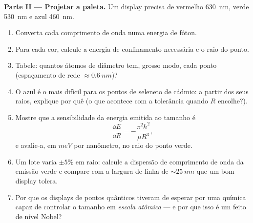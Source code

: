 \begin{problem}
\medskip\noindent\textbf{Parte II --- Projetar a paleta.}
Um display precisa de vermelho \qty{630}{nm}, verde \qty{530}{nm} e
azul \qty{460}{nm}.
\begin{enumerate}[resume]
  \item Converta cada comprimento de onda numa energia de fóton.
  \item Para cada cor, calcule a energia de confinamento necessária e
        o raio do ponto.
  \item Tabele: quantos átomos de diâmetro tem, grosso modo, cada
        ponto (espaçamento de rede $\approx \qty{0.6}{nm}$)?
  \item O azul é o mais difícil para os pontos de seleneto de cádmio:
        a partir dos seus raios, explique por quê (o que acontece com
        a tolerância quando $R$ encolhe?).
  \item Mostre que a sensibilidade da energia emitida ao tamanho é
        \[
        \frac{\dd E}{\dd R} = -\frac{\pi^2\hbar^2}{\mu R^3} ,
        \]
        e avalie-a, em $\unit{meV}$ por nanômetro, no raio do ponto
        verde.
  \item Um lote varia $\pm5\%$ em raio: calcule a dispersão de
        comprimento de onda da emissão verde e compare com a largura
        de linha de $\sim\qty{25}{nm}$ que um bom display tolera.
  \item Por que os displays de pontos quânticos tiveram de esperar por
        uma química capaz de controlar o tamanho em \emph{escala
        atômica} --- e por que isso é um feito de nível Nobel?
\end{enumerate}


\end{problem}
